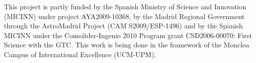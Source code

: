 
\acknowledgements This project is partly funded by the Spanish Ministry of Science and Innovation (MICINN) under project AYA2009-10368, by the Madrid Regional Government through the AstroMadrid Project (CAM S2009/ESP-1496) and by the Spanish MICINN under the Consolider-Ingenio 2010 Program grant CSD2006-00070: First Science with the GTC. This work is being done in the framework of the Moncloa Campus of International Excellence (UCM-UPM).
